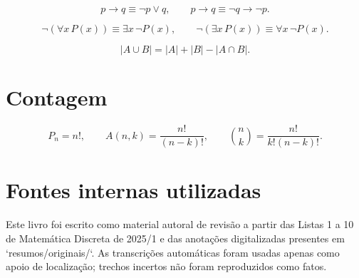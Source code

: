 \documentclass[12pt,a4paper,openany]{book}
\begin{document}
\[p\to q\equiv\neg p\lor q, \qquad p\to q\equiv\neg q\to\neg p.\]



\[\neg(\forall x\,P(x))\equiv\exists x\,\neg P(x), \qquad \neg(\exists x\,P(x))\equiv\forall x\,\neg P(x).\]



\[|A\cup B|=|A|+|B|-|A\cap B|.\]



\section{Contagem}



\[P_n=n!, \qquad A(n,k)=\frac{n!}{(n-k)!}, \qquad \binom{n}{k}=\frac{n!}{k!(n-k)!}.\]



\section{Fontes internas utilizadas}



Este livro foi escrito como material autoral de revisão a partir das Listas 1 a 10 de Matemática Discreta de 2025/1 e das anotações digitalizadas presentes em `resumos/originais/`. As transcrições automáticas foram usadas apenas como apoio de localização; trechos incertos não foram reproduzidos como fatos.
\end{document}
